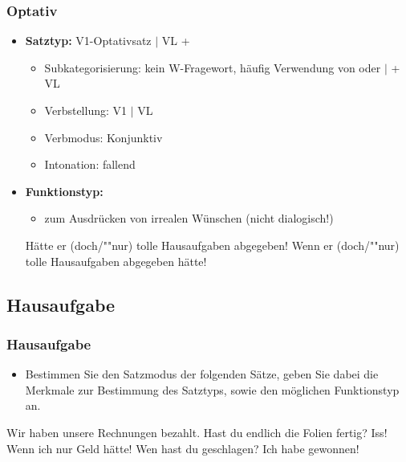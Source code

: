 \begin{frame}
\frametitle{Optativ}

\begin{itemize}
	\item \textbf{Satztyp:} V1-Optativsatz $|$ VL + 
	\begin{itemize}
		\item Subkategorisierung: kein W-Fragewort, häufig Verwendung von  oder  $|$  + VL
		\item Verbstellung: V1 $|$ VL
		\item Verbmodus: Konjunktiv
		\item Intonation: fallend
	\end{itemize}
	\item \textbf{Funktionstyp:}
	\begin{itemize}
		\item zum Ausdrücken von irrealen Wünschen (nicht dialogisch!)
	\end{itemize}
	
	\eal
	\ex Hätte er (doch/""nur) tolle Hausaufgaben abgegeben! 
	\ex Wenn er (doch/""nur) tolle Hausaufgaben abgegeben hätte!
	\zl
		
\end{itemize}

\end{frame}


\subsection{Hausaufgabe}


\begin{frame}
\frametitle{Hausaufgabe}

\begin{itemize}
	\item Bestimmen Sie den Satzmodus der folgenden Sätze, geben Sie dabei die Merkmale zur Bestimmung des Satztyps, sowie den möglichen Funktionstyp an. 
\end{itemize}


\ea \label{ex:Rechnung} Wir haben unsere Rechnungen bezahlt. 
\ex \label{ex:Folien} Hast du endlich die Folien fertig?
\ex \label{ex:Iss} Iss!
\ex \label{ex:Geld} Wenn ich nur Geld hätte!
\ex \label{ex:geschlagen} Wen hast du geschlagen?
\ex \label{ex:gewonnen} Ich habe gewonnen!
\z

\end{frame}


